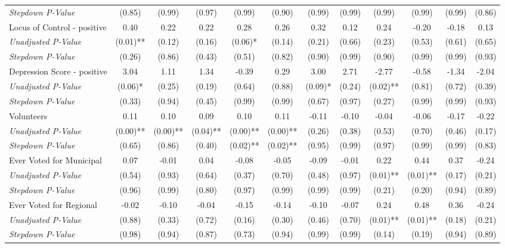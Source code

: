 \begin{tabular}{l c c c c c c c c c c c}
\quad \textit{Stepdown P-Value} & (0.85) & (0.99) & (0.97) & (0.99) & (0.90) & (0.99) & (0.99) & (0.99) & (0.99) & (0.99) & (0.86) \\
Locus of Control - positive & 0.40 & 0.22 & 0.22 & 0.28 & 0.26 & 0.32 & 0.12 & 0.24 & -0.20 & -0.18 & 0.13 \\
\quad \textit{Unadjusted P-Value} & (0.01)** & (0.12) & (0.16) & (0.06)* & (0.14) & (0.21) & (0.66) & (0.23) & (0.53) & (0.61) & (0.65) \\
\quad \textit{Stepdown P-Value} & (0.26) & (0.86) & (0.43) & (0.51) & (0.82) & (0.90) & (0.99) & (0.90) & (0.99) & (0.99) & (0.93) \\
Depression Score - positive & 3.04 & 1.11 & 1.34 & -0.39 & 0.29 & 3.00 & 2.71 & -2.77 & -0.58 & -1.34 & -2.04 \\
\quad \textit{Unadjusted P-Value} & (0.06)* & (0.25) & (0.19) & (0.64) & (0.88) & (0.09)* & (0.24) & (0.02)** & (0.81) & (0.72) & (0.39) \\
\quad \textit{Stepdown P-Value} & (0.33) & (0.94) & (0.45) & (0.99) & (0.99) & (0.67) & (0.97) & (0.27) & (0.99) & (0.99) & (0.93) \\
Volunteers & 0.11 & 0.10 & 0.09 & 0.10 & 0.11 & -0.11 & -0.10 & -0.04 & -0.06 & -0.17 & -0.22 \\
\quad \textit{Unadjusted P-Value} & (0.00)** & (0.00)** & (0.04)** & (0.00)** & (0.00)** & (0.26) & (0.38) & (0.53) & (0.70) & (0.46) & (0.17) \\
\quad \textit{Stepdown P-Value} & (0.65) & (0.86) & (0.40) & (0.02)** & (0.02)** & (0.95) & (0.99) & (0.97) & (0.99) & (0.99) & (0.83) \\
Ever Voted for Municipal & 0.07 & -0.01 & 0.04 & -0.08 & -0.05 & -0.09 & -0.01 & 0.22 & 0.44 & 0.37 & -0.24 \\
\quad \textit{Unadjusted P-Value} & (0.54) & (0.93) & (0.64) & (0.37) & (0.70) & (0.48) & (0.97) & (0.01)** & (0.01)** & (0.17) & (0.21) \\
\quad \textit{Stepdown P-Value} & (0.96) & (0.99) & (0.80) & (0.97) & (0.99) & (0.99) & (0.99) & (0.21) & (0.20) & (0.94) & (0.89) \\
Ever Voted for Regional & -0.02 & -0.10 & -0.04 & -0.15 & -0.14 & -0.10 & -0.07 & 0.24 & 0.48 & 0.36 & -0.24 \\
\quad \textit{Unadjusted P-Value} & (0.88) & (0.33) & (0.72) & (0.16) & (0.30) & (0.46) & (0.70) & (0.01)** & (0.01)** & (0.18) & (0.21) \\
\quad \textit{Stepdown P-Value} & (0.98) & (0.94) & (0.87) & (0.73) & (0.94) & (0.99) & (0.99) & (0.14) & (0.19) & (0.94) & (0.89) \\

\end{tabular}
